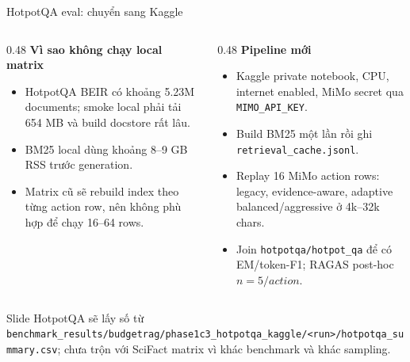\documentclass[aspectratio=169,10pt]{beamer}
\newcommand{\smallcode}[1]{\texttt{\scriptsize #1}}
\newcommand{\minihead}[1]{{\bfseries\color{AccentDark}#1}}
\newenvironment{tightitemize}{\begin{itemize}\setlength{\itemsep}{0.22em}\setlength{\parskip}{0pt}}{\end{itemize}}
\begin{document}
\begin{frame}{HotpotQA eval: chuyển sang Kaggle}
  \small
  \begin{columns}[T,onlytextwidth]
    \begin{column}{0.48\textwidth}
      \minihead{Vì sao không chạy local matrix}\\[-0.08cm]
      \begin{tightitemize}
        \item HotpotQA BEIR có khoảng 5.23M documents; smoke local phải tải 654 MB và build docstore rất lâu.
        \item BM25 local dùng khoảng 8--9 GB RSS trước generation.
        \item Matrix cũ sẽ rebuild index theo từng action row, nên không phù hợp để chạy 16--64 rows.
      \end{tightitemize}
    \end{column}
    \begin{column}{0.48\textwidth}
      \minihead{Pipeline mới}\\[-0.08cm]
      \begin{tightitemize}
        \item Kaggle private notebook, CPU, internet enabled, MiMo secret qua \smallcode{MIMO\_API\_KEY}.
        \item Build BM25 một lần rồi ghi \smallcode{retrieval\_cache.jsonl}.
        \item Replay 16 MiMo action rows: legacy, evidence-aware, adaptive balanced/aggressive ở 4k--32k chars.
        \item Join \smallcode{hotpotqa/hotpot\_qa} để có EM/token-F1; RAGAS post-hoc \(n=5/action\).
      \end{tightitemize}
    \end{column}
  \end{columns}
  \vspace{0.28cm}
  \centering
  \scriptsize\color{Muted}
  Slide HotpotQA sẽ lấy số từ \smallcode{benchmark\_results/budgetrag/phase1c3\_hotpotqa\_kaggle/\textless run\textgreater/hotpotqa\_summary.csv}; chưa trộn với SciFact matrix vì khác benchmark và khác sampling.
\end{frame}
\end{document}
